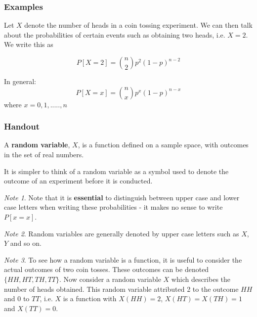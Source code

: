 \documentclass[12pt,a4paper]{article}
\theoremstyle{regla}
\theoremstyle{remark}
\newtheorem{notes}{Note}[section]
\theoremstyle{definition}
\theoremstyle{nonumberbreak}
\begin{document}
\subsubsection{Examples}
 
\begin{xmpl}
Let $X$ denote the number of heads in a coin tossing experiment. We can then talk about the probabilities of certain events such as obtaining two heads, i.e. $X=2$. We write this as 

$$
P[X=2]={n \choose 2}p^2(1-p)^{n-2}
$$

In general: 
$$
P[X=x] = {n \choose x}p^x (1-p)^{n-x}
$$
where 
$x = 0,1,.....,n$

\end{xmpl} 

\subsubsection{Handout}
\begin{defn}
A {\bf random variable}, $X$, is a function defined on a sample space, with outcomes in the set of real numbers.
\end{defn} 


It is simpler to think of a random variable as a symbol used to denote the outcome of an experiment before it is conducted. 



\begin{notes}

Note that it is {\bf essential} to distinguish between upper case and lower case letters
when writing these probabilities - it makes no sense to write $P[x=x]$.
\end{notes} 
\begin{notes}

Random variables are generally denoted by upper case letters such as $X$, $Y$ and so on.
\end{notes} 
\begin{notes}
To see how a random variable is a function, it is useful to consider the actual outcomes of two coin tosses. These outcomes can be denoted $\{HH, HT, TH, TT\}$.
Now consider a random variable $X$ which describes the number of heads obtained. This random variable attributed 2 to the outcome $HH$ and 0 to $TT$, i.e.
$X$ is a function with $X(HH)=2$, $X(HT)=X(TH)=1$ and $X(TT)=0$.
\end{notes} 



\end{document}
